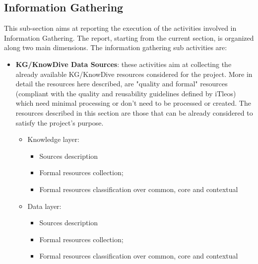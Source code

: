 \subsection{Information Gathering}
This sub-section aims at reporting the execution of the activities involved in Information Gathering. The report, starting from the current section, is organized along two main dimensions. The information gathering sub activities are:
\begin{itemize}
    \item \textbf{KG/KnowDive Data Sources}: these activities aim at collecting the already available KG/KnowDive resources considered for the project. More in detail the resources here described, are "quality and formal" resources (compliant with the quality and reusability guidelines defined by iTleos) which need minimal processing or don't need to be processed or created. The resources described in this section are those that can be already considered to satisfy the project's purpose.
    \begin{itemize}
        \item Knowledge layer:
        \begin{itemize}
            \item Sources description
            \item Formal resources collection;
            \item Formal resources classification over common, core and contextual
        \end{itemize}
        \item Data layer:
        \begin{itemize}
            \item Sources description
            \item Formal resources collection;
            \item Formal resources classification over common, core and contextual
        \end{itemize}
    \end{itemize}


\end{itemize}
